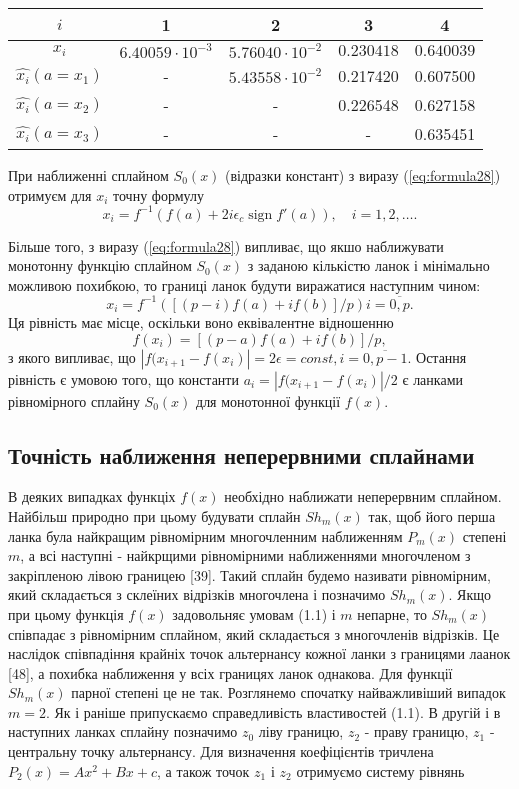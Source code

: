 \documentclass[ukrainian,14pt]{extarticle}
\newcommand{\sign}{\operatorname{sign}}
\begin{document}
\bgroup
\def\arraystretch{1.5}
\begin{center}
\begin{tabular}{ c | c |
c | c | c }
 $i$ & 1 & 2 & 3 & 4 \\
 \hline
 $x_i$ & $6.40059 \cdot 10^{-3}$ & $5.76040 \cdot 10^{-2}$ & $0.230418$ & $0.640039$ \\  
 \hline
  $\hat{x_i} (a = x_1)$ & - & $5.43558 \cdot 10^{-2}$ & 0.217420 & 0.607500 \\  
 \hline
 $\hat{x_i} (a = x_2)$ & - & - & 0.226548 & 0.627158   \\
 \hline
   $\hat{x_i} (a = x_3)$ & - & - & - & 0.635451 \\  
\end{tabular}
\end{center}
\egroup

При наближенні сплайном $S_0(x)$ (відразки констант) з виразу (\ref{eq:formula28}) отримуєм для $x_i$ точну формулу
$$x_i = f^{-1} (f(a) + 2i\epsilon_c \sign{f'(a)}), \quad i = 1,2, \ldots .$$

Більше того, з виразу (\ref{eq:formula28}) випливає, що якшо наближувати монотонну функцію сплайном $S_0(x)$ з заданою кількістю ланок і мінімально можливою похибкою, то границі ланок будути виражатися наступним чином:
$$x_i = f^{-1}([(p - i)f(a) + if(b)] / p) i = \overline{0, p}.$$
Ця рівність має місце, оскільки воно еквівалентне відношенню 
$$f(x_i) = [(p-a)f(a) + if(b)]/p,$$
з якого випливає, що $|f(x_{i+1} - f(x_i)| = 2\epsilon = const, i = \overline{0, p-1}$. Остання рівність є умовою того, що константи $a_i = |f(x_{i+1}- f(x_i)| / 2$ є ланками рівномірного сплайну $S_0(x)$ для монотонної функції $f(x)$.

\subsection{Точність наближення неперервними сплайнами}

В деяких випадках функціх $f(x)$ необхідно наближати неперервним сплайном. Найбільш природно при цьому будувати сплайн $S h_m(x)$ так, щоб його перша ланка була найкращим рівномірним многочленним наближенням $P_m(x)$ степені $m$, а всі наступні - найкрщими рівномірними наближеннями многочленом з закріпленою лівою границею [39]. Такий сплайн будемо називати рівномірним, який складається з склеїних відрізків многочлена і позначимо $S h_m(x)$. Якщо при цьому функція $f(x)$ задовольняє умовам (1.1) і $m$ непарне, то $S h_m(x)$ співпадає з рівномірним сплайном, який складається з многочленів відрізків. Це наслідок співпадіння крайніх точок альтернансу кожної ланки з границями лаанок [48], а похибка наближення у всіх границях ланок однакова. Для функції $S h_m(x)$ парної степені це не так. Розглянемо спочатку найважливіший випадок $m = 2$. Як і раніше припускаємо справедливість властивостей (1.1).  В другій і в наступних ланках сплайну позначимо $z_0$ ліву границю, $z_2$ - праву границю, $z_1$ - центральну точку альтернансу. Для визначення коефіцієнтів тричлена $P_2(x) = Ax^2 + Bx + c$, а також точок $z_1$ і $z_2$ отримуємо систему рівнянь
\end{document}
